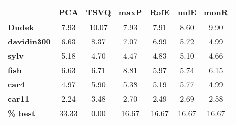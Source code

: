 \begin{tabular}{|l|c|c|c|c|c|c|}
\hline
&\textbf{PCA}&\textbf{TSVQ}&\textbf{maxP}&\textbf{RofE}&\textbf{nulE}&\textbf{monR}\\\hline
\textbf{Dudek}&7.93&10.07&7.93&7.91&8.60&9.90\\\hline
\textbf{davidin300}&6.63&8.37&7.07&6.99&5.72&4.99\\\hline
\textbf{sylv}&5.18&4.70&4.47&4.83&5.10&4.66\\\hline
\textbf{fish}&6.63&6.71&8.81&5.97&5.74&6.15\\\hline
\textbf{car4}&4.97&5.90&5.38&5.19&5.77&4.99\\\hline
\textbf{car11}&2.24&3.48&2.70&2.49&2.69&2.58\\\hline
\textbf{ \% best}&33.33&0.00&16.67&16.67&16.67&16.67\\\hline
\end{tabular}
